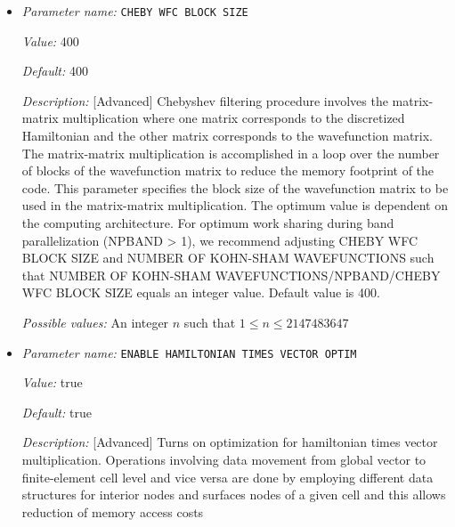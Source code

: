 \begin{itemize}
{\it Possible values:} A floating point number $v$ such that $0 \leq v \leq 2000$
\item {\it Parameter name:} {\tt CHEBY WFC BLOCK SIZE}
\label{parameters:SCF parameters/Eigen_2dsolver parameters/CHEBY WFC BLOCK SIZE}
\label{parameters:SCF_20parameters/Eigen_2dsolver_20parameters/CHEBY_20WFC_20BLOCK_20SIZE}


{\it Value:} 400


{\it Default:} 400


{\it Description:} [Advanced] Chebyshev filtering procedure involves the matrix-matrix multiplication where one matrix corresponds to the discretized Hamiltonian and the other matrix corresponds to the wavefunction matrix. The matrix-matrix multiplication is accomplished in a loop over the number of blocks of the wavefunction matrix to reduce the memory footprint of the code. This parameter specifies the block size of the wavefunction matrix to be used in the matrix-matrix multiplication. The optimum value is dependent on the computing architecture. For optimum work sharing during band parallelization (NPBAND > 1), we recommend adjusting CHEBY WFC BLOCK SIZE and NUMBER OF KOHN-SHAM WAVEFUNCTIONS such that NUMBER OF KOHN-SHAM WAVEFUNCTIONS/NPBAND/CHEBY WFC BLOCK SIZE equals an integer value. Default value is 400.


{\it Possible values:} An integer $n$ such that $1\leq n \leq 2147483647$
\item {\it Parameter name:} {\tt ENABLE HAMILTONIAN TIMES VECTOR OPTIM}
\label{parameters:SCF parameters/Eigen_2dsolver parameters/ENABLE HAMILTONIAN TIMES VECTOR OPTIM}
\label{parameters:SCF_20parameters/Eigen_2dsolver_20parameters/ENABLE_20HAMILTONIAN_20TIMES_20VECTOR_20OPTIM}


{\it Value:} true


{\it Default:} true


{\it Description:} [Advanced] Turns on optimization for hamiltonian times vector multiplication. Operations involving data movement from global vector to finite-element cell level and vice versa are done by employing different data structures for interior nodes and surfaces nodes of a given cell and this allows reduction of memory access costs



\end{itemize}
